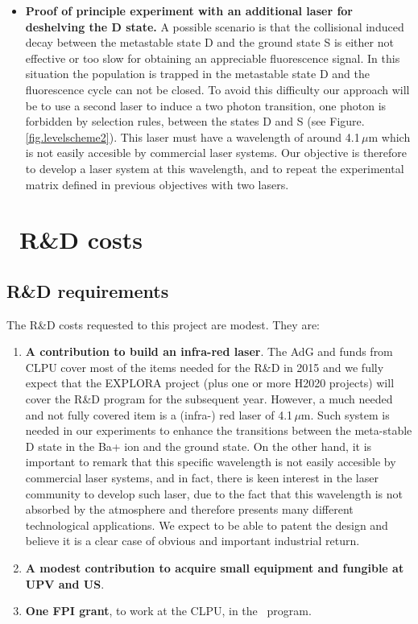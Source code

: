 \documentclass[a4paper,11pt,oneside]{article}
\begin{document}
\begin{itemize}
	\item \textbf{Proof of principle experiment with an additional laser for deshelving the D state.}
A possible scenario is that the collisional induced decay between the metastable state D and the ground state S is either not effective or too slow for obtaining an appreciable fluorescence signal. In this situation the population is trapped in the metastable state D  and the fluorescence cycle can not be closed. To avoid this difficulty our approach will be to use a second laser to induce a two photon transition, one photon is forbidden by selection rules, between the states D and S (see Figure.\,\ref{fig.levelscheme2}). This laser must have a wavelength of around 4.1\,$\mu$m which is not easily accesible by commercial laser systems. Our objective is therefore to develop a laser system at this wavelength, and to repeat the experimental matrix defined in previous objectives with two lasers.
	
\end{itemize}

\section{\BATA\ R\&D costs}
\label{bata.costs}

\subsection{R\&D requirements}
The R\&D costs requested to this project are modest. They are:
\begin{enumerate}
\item {\bf A contribution to build an infra-red laser}. The AdG and funds from CLPU cover most of the items needed for the R\&D in 2015 and we fully expect that the EXPLORA project (plus one or more H2020 projects) will cover the R\&D program for the subsequent year. However, a much needed and not fully covered item is a (infra-) red laser of 4.1\,$\mu$m. Such system is needed in our experiments to enhance the transitions between the meta-stable D state in the Ba+ ion and the ground state. On the other hand, it is important to remark that this specific wavelength is not easily accesible by  commercial laser systems, and in fact, there is keen interest in the laser community to develop such laser, due to the fact that this wavelength is not absorbed by the atmosphere and therefore presents many different technological applications. We expect to be able to patent the design and believe it is a clear case of obvious and important industrial return. 
\item {\bf A modest contribution to acquire small equipment and fungible at UPV and US}.
\item {\bf One FPI grant}, to work at the CLPU, in the \BATA\ program. 
\end{enumerate}
\end{document}

